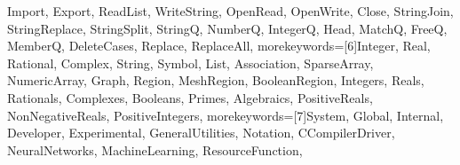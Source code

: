 {{    Import, Export, ReadList, WriteString, OpenRead, OpenWrite, Close,
    StringJoin, StringReplace, StringSplit, StringQ, NumberQ, IntegerQ,
    Head, MatchQ, FreeQ, MemberQ, DeleteCases, Replace, ReplaceAll},
  morekeywords={[6]Integer, Real, Rational, Complex, String, Symbol,
    List, Association, SparseArray, NumericArray,
    Graph, Region, MeshRegion, BooleanRegion,
    Integers, Reals, Rationals, Complexes, Booleans, Primes,
    Algebraics, PositiveReals, NonNegativeReals, PositiveIntegers},
  morekeywords={[7]System, Global, Internal, Developer, Experimental,
    GeneralUtilities, Notation, CCompilerDriver, NeuralNetworks,
    MachineLearning, ResourceFunction},
}



